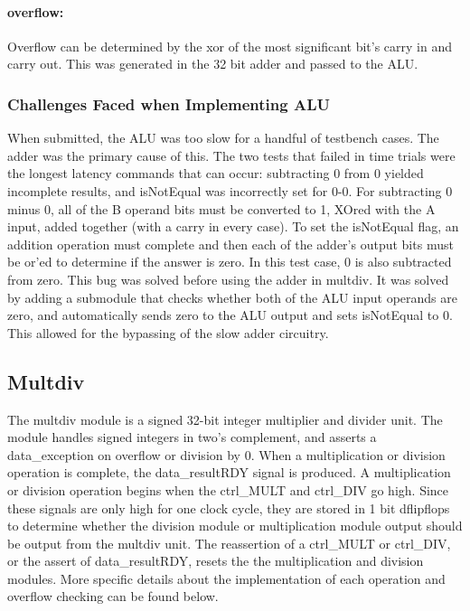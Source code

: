 \documentclass[letterpaper]{article}
\begin{document}
\paragraph{overflow:}
Overflow can be determined by the xor of the most significant bit's carry in and carry out. This was generated in the 32 bit adder and passed to the ALU. 
\newline
\subsubsection{Challenges Faced when Implementing ALU}
When submitted, the ALU was too slow for a handful of testbench cases. The adder was the primary cause of this. The two tests that failed in time trials were the longest latency commands that can occur: subtracting 0 from 0 yielded incomplete results, and isNotEqual was incorrectly set for 0-0. For subtracting 0 minus 0, all of the B operand bits must be converted to 1, XOred with the A input, added together (with a carry in every case). To set the isNotEqual flag, an addition operation must complete and then each of the adder's output bits must be or'ed to determine if the answer is zero. In this test case, 0 is also subtracted from zero. \newline
This bug was solved before using the adder in multdiv. It was solved by adding a submodule that checks whether both of the ALU input operands are zero, and automatically sends zero to the ALU output and sets isNotEqual to 0. This allowed for the bypassing of the slow adder circuitry.

\subsection{Multdiv}
The multdiv module is a signed 32-bit integer multiplier and divider unit. The module handles signed integers in two’s complement, and asserts a data\_exception on overflow or division by 0. When a multiplication or division operation is complete, the data\_resultRDY signal is produced.
A multiplication or division operation begins when the ctrl\_MULT and ctrl\_DIV go high. Since these signals are only high for one clock cycle, they are stored in 1 bit dflipflops to determine whether the division module or multiplication module output should be output from the multdiv unit. The reassertion of a ctrl\_MULT or ctrl\_DIV, or the assert of data\_resultRDY, resets the the multiplication and division modules. More specific details about the implementation of each operation and overflow checking can be found below.
\end{document}
